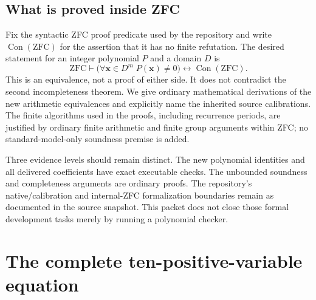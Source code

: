 \documentclass[11pt]{article}
\theoremstyle{remark}\newtheorem{remark}[theorem]{Remark}
\newcommand{\Con}{\operatorname{Con}}
\begin{document}
\subsection{What is proved inside ZFC}

Fix the syntactic ZFC proof predicate used by the repository and write
$\Con(\mathrm{ZFC})$ for the assertion that it has no finite refutation.
The desired statement for an integer polynomial $P$ and a domain $D$ is
\[
\mathrm{ZFC}\vdash
\bigl(\forall\mathbf{x}\in D^m\;P(\mathbf{x})\ne0\bigr)
\longleftrightarrow\Con(\mathrm{ZFC}).
\]
This is an equivalence, not a proof of either side. It does not contradict
the second incompleteness theorem. We give ordinary mathematical derivations
of the new arithmetic equivalences and explicitly name the inherited source
calibrations. The finite algorithms used in the proofs, including recurrence
periods, are justified by ordinary finite arithmetic and finite group
arguments within ZFC; no standard-model-only soundness premise is added.

Three evidence levels should remain distinct. The new polynomial identities
and all delivered coefficients have exact executable checks. The unbounded
soundness and completeness arguments are ordinary proofs. The repository's
native/calibration and internal-ZFC formalization boundaries remain as
documented in the source snapshot. This packet does not close those formal
development tasks merely by running a polynomial checker.

\section{The complete ten-positive-variable equation}
\label{sec:equation}
\end{document}
